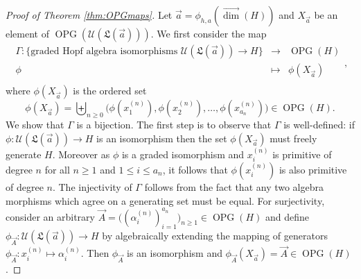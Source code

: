 \documentclass[11pt]{amsart}
\theoremstyle{definition}
\numberwithin{equation}{section}
\newcommand{\vecdim}{\overrightarrow{\dim}}
\newcommand{\OPG}{\operatorname{OPG}}
\begin{document}
\begin{proof}[Proof of Theorem \ref{thm:OPGmaps}]
Let $\vec{a} = \phi_{h,a}(\vecdim(H))$ and $X_{\vec{a}}$ be an element of $\OPG(\mathcal{U}(\mathfrak{L}(\vec{a})))$.
We first consider the map 
\[
\begin{array}{rcl}
\Gamma: \{\text{graded Hopf algebra isomorphisms $\mathcal{U}(\mathfrak{L}(\vec{a})) \to H$}\} &\to& \OPG(H) \\
\phi & \mapsto & \phi(X_{\vec{a}}) \\
\end{array},
\]
where $\phi(X_{\vec{a}})$ is the  ordered set
\[
\phi(X_{\vec{a}}) = \biguplus_{n \ge 0} \big( \phi(x_{1}^{(n)}), \phi(x_{2}^{(n)}), \ldots, \phi(x_{a_{n}}^{(n)}) \big) \in \OPG(H).
\]
We show that $\Gamma$ is a bijection.  The first step is to observe that $\Gamma$
is well-defined: if $\phi: \mathcal{U}(\mathfrak{L}(\vec{a})) \to H$
is an isomorphism then the set $\phi(X_{\vec{a}})$ must freely generate $H$.
Moreover as $\phi$ is a graded isomorphism and $x_{i}^{(n)}$ is primitive
of degree $n$ for all $n \ge 1$ and $1 \le i \le a_{n}$, it follows that
$\phi(x_{i}^{(n)})$ is also primitive of degree $n$.
The injectivity of $\Gamma$ follows from the fact that any two algebra
morphisms which agree on a generating set must be equal.
For surjectivity, consider an arbitrary
$\vec{A} = \big((\alpha_{i}^{(n)})_{i=1}^{a_{n}}\big)_{n \ge 1} \in \OPG(H)$
and define $\phi_{\vec{A}}:\mathcal{U}(\mathfrak{L}(\vec{a})) \to H$ by
algebraically extending the mapping of generators $\phi_{\vec{A}}: x_{i}^{(n)} \mapsto \alpha_i^{(n)}$.
Then $\phi_{\vec{A}}$ is an isomorphism and $\phi_{\vec{A}}(X_{\vec{a}}) = \vec{A} \in \OPG(H)$.


\end{proof}
\end{document}
